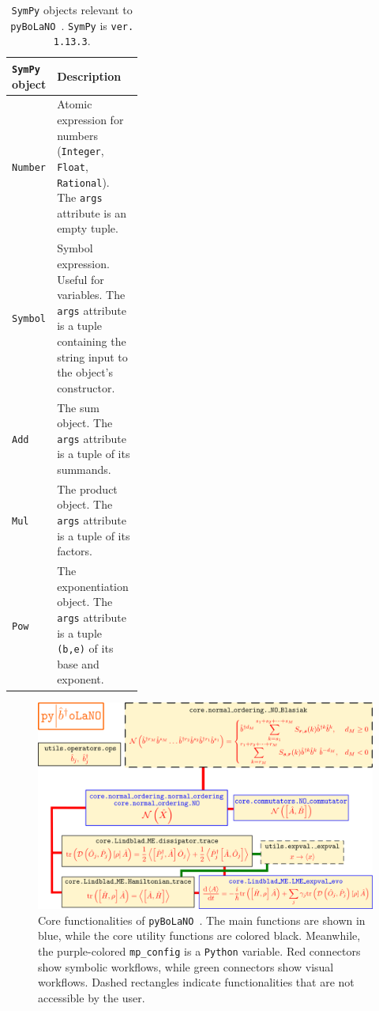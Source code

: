 \documentclass[onecolumn, 12pt, sort&compress]{elsarticle}
\newcounter{bla}
\newcommand{\inlinecode}[1]{\texttt{#1}}
\newcommand{\pybolano}{\texttt{pyBoLaNO}~}
\newenvironment{revision}{%
\color{red}
}
{}
\begin{document}
\begin{table}[!t]
\centering

\caption{\texttt{SymPy} objects \begin{revision}relevant to\end{revision} \pybolano. \texttt{SymPy} is \inlinecode{ver. 1.13.3}.}

\begin{tabular}{p{0.33\linewidth}|>{\raggedright\arraybackslash}p{}}
    \hline
    \hline
        \texttt{SymPy} object 
        & 
        Description
    \\
    \hline
    \hline
        \inlinecode{Number}
        &
        Atomic expression for numbers (\inlinecode{Integer}, \inlinecode{Float}, \inlinecode{Rational}). The \inlinecode{args} attribute is an empty tuple.
    \\
    \hline
        \inlinecode{Symbol}
        &
        Symbol expression. Useful for variables. The \inlinecode{args} attribute is a tuple containing the string input to the object's constructor.
    \\
    \hline
        \inlinecode{Add}
        &
        The sum object. The \inlinecode{args} attribute is a tuple of its summands.
    \\
    \hline
        \inlinecode{Mul}
        &
        The product object. The \inlinecode{args} attribute is a tuple of its factors.
    \\
    \hline
        \inlinecode{Pow}
        &
        The exponentiation object. The \inlinecode{args} attribute is a tuple \inlinecode{(b,e)} of its base and exponent.
    \\
    \hline
    \hline
\end{tabular}
\label{table_1}
\end{table}

\begin{figure}[!t]
    \centering
    \includegraphics[width=0.8\linewidth]{fig_1.png}
    \caption{Core functionalities of \pybolano. The main functions are shown in blue, while the core utility functions are colored black. Meanwhile, the purple-colored \inlinecode{mp_config} is a \texttt{Python} variable. Red connectors show symbolic workflows, while green connectors show visual workflows. Dashed rectangles indicate functionalities that are not accessible by the user.}
    \label{fig_1}
\end{figure}
\end{document}
